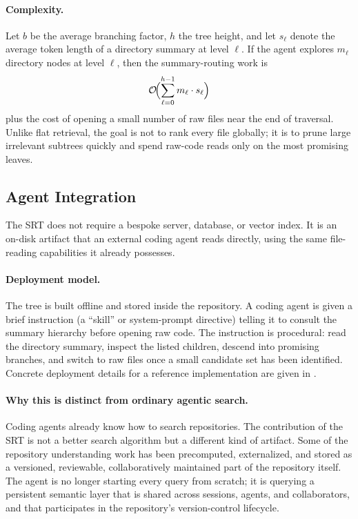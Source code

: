 \documentclass[11pt,a4paper]{article}
\newcommand{\srt}{\textsc{SRT}}
\newcommand{\bigO}{\mathcal{O}}
\begin{document}
\paragraph{Complexity.}
Let $b$ be the average branching factor, $h$ the tree height, and let $s_\ell$ denote the average token length of a directory summary at level $\ell$.
If the agent explores $m_\ell$ directory nodes at level $\ell$, then the summary-routing work is
\begin{equation}
    \bigO\!\Bigl(\sum_{\ell=0}^{h-1} m_\ell \cdot s_\ell\Bigr)
\end{equation}
plus the cost of opening a small number of raw files near the end of traversal.
Unlike flat retrieval, the goal is not to rank every file globally; it is to prune large irrelevant subtrees quickly and spend raw-code reads only on the most promising leaves.

\subsection{Agent Integration}\label{sec:agentintegration}

The \srt{} does not require a bespoke server, database, or vector index.
It is an on-disk artifact that an external coding agent reads directly, using the same file-reading capabilities it already possesses.

\paragraph{Deployment model.}
The tree is built offline and stored inside the repository.
A coding agent is given a brief instruction (a ``skill'' or system-prompt directive) telling it to consult the summary hierarchy before opening raw code.
The instruction is procedural: read the directory summary, inspect the listed children, descend into promising branches, and switch to raw files once a small candidate set has been identified.
Concrete deployment details for a reference implementation are given in .

\paragraph{Why this is distinct from ordinary agentic search.}
Coding agents already know how to search repositories. The contribution of the \srt{} is not a better search algorithm but a different kind of artifact. Some of the repository understanding work has been precomputed, externalized, and stored as a versioned, reviewable, collaboratively maintained part of the repository itself. The agent is no longer starting every query from scratch; it is querying a persistent semantic layer that is shared across sessions, agents, and collaborators, and that participates in the repository's version-control lifecycle.
\end{document}
